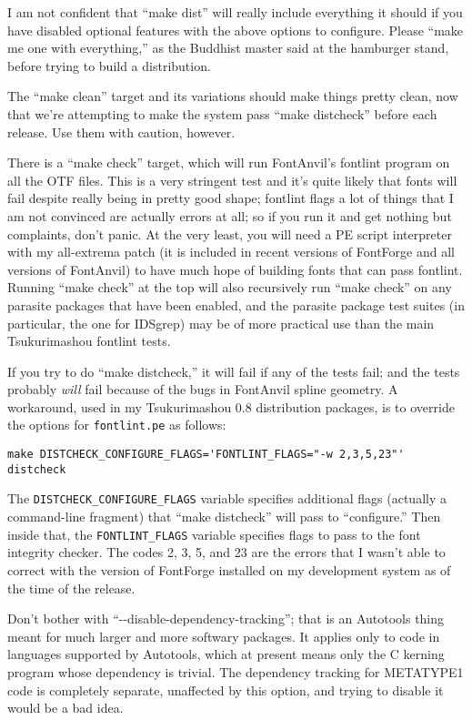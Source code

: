 \documentclass[14pt]{extarticle}
\begin{document}
I am not confident that ``make dist'' will really include everything it
should if you have disabled optional features with the above options to
configure.  Please ``make me one with everything,'' as the Buddhist master
said at the hamburger stand, before trying to build a distribution.

The ``make clean'' target and its variations should make things pretty
clean, now that we're attempting to make the system pass ``make distcheck''
before each release.  Use them with caution, however.

There is a ``make check'' target, which will run FontAnvil's fontlint
program on all the OTF files.  This is a very stringent test and it's quite
likely that fonts will fail despite really being in pretty good shape;
fontlint flags a lot of things that I am not convinced are actually errors
at all; so if you run it and get nothing but complaints, don't panic.  At
the very least, you will need a PE script interpreter with my all-extrema
patch (it is included in recent versions of FontForge and all versions of
FontAnvil) to have much hope of building fonts that can pass fontlint. 
Running ``make check'' at the top will also recursively run ``make check''
on any parasite packages that have been enabled, and the parasite package
test suites (in particular, the one for IDSgrep) may be of more practical
use than the main Tsukurimashou fontlint tests.

If you try to do ``make distcheck,'' it will fail if any of the tests fail;
and the tests probably \emph{will} fail because of the bugs in FontAnvil
spline geometry.  A workaround, used in my Tsukurimashou 0.8 distribution
packages, is to override the options for \texttt{fontlint.pe} as follows:
\begin{verbatim}
make DISTCHECK_CONFIGURE_FLAGS='FONTLINT_FLAGS="-w 2,3,5,23"' distcheck
\end{verbatim}

The \texttt{DISTCHECK\_CONFIGURE\_FLAGS} variable specifies additional flags
(actually a command-line fragment) that ``make distcheck'' will pass to
``configure.''  Then inside that, the \texttt{FONTLINT\_FLAGS} variable
specifies flags to pass to the font integrity checker.  The codes 2, 3, 5,
and 23 are the errors that I wasn't able to correct with the version of
FontForge installed on my development system as of the time of the release.

Don't bother with ``-{}-disable-dependency-tracking''; that is an
Autotools thing meant for much larger and more softwary packages.  It
applies only to code in languages supported by Autotools, which at
present means only the C kerning program whose dependency is trivial. 
The dependency tracking for METATYPE1 code is completely separate,
unaffected by this option, and trying to disable it would be a bad
idea.
\end{document}
